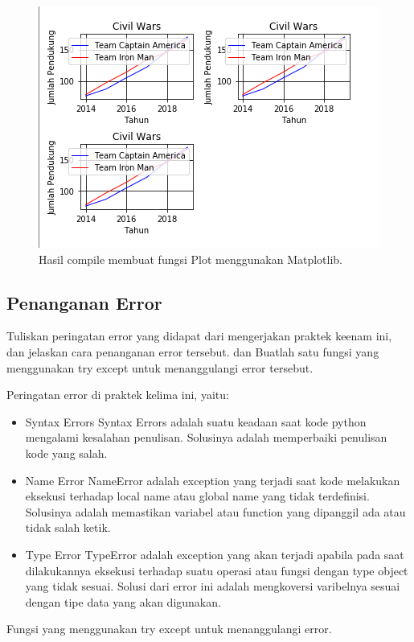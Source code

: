 \begin{figure}[H]
	\includegraphics[width=12cm]{figures/6/Praktek/1174038/p4.png}
	\centering
	\caption{Hasil compile membuat fungsi Plot menggunakan Matplotlib.}
\end{figure}


\subsection{Penanganan Error}
Tuliskan  peringatan  error  yang  didapat  dari  mengerjakan  praktek  keenam  ini, dan  jelaskan  cara  penanganan  error  tersebut. dan  Buatlah  satu  fungsi  yang menggunakan try except untuk menanggulangi error tersebut.

\hfill \break
Peringatan error di praktek kelima ini, yaitu:
\begin{itemize}
	\item Syntax Errors
	Syntax Errors adalah suatu keadaan saat kode python mengalami kesalahan penulisan. Solusinya adalah memperbaiki penulisan kode yang salah.
	
	\item Name Error
	NameError adalah exception yang terjadi saat kode melakukan eksekusi terhadap local name atau global name yang tidak terdefinisi. Solusinya adalah memastikan variabel atau function yang dipanggil ada atau tidak salah ketik.
	
	\item Type Error
	TypeError adalah exception yang akan terjadi apabila pada saat dilakukannya eksekusi terhadap suatu operasi atau fungsi dengan type object yang tidak sesuai. Solusi dari error ini adalah mengkoversi varibelnya sesuai dengan tipe data yang akan digunakan.
\end{itemize}
\hfill \break
Fungsi yang menggunakan try except untuk menanggulangi error.

